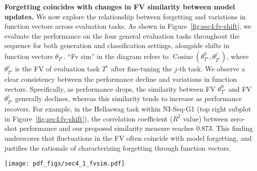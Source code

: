 

\textbf{Forgetting coincides with changes in FV similarity between model updates.} 
We now explore the relationship between forgetting and variations in function vectors across evaluation tasks. As shown in Figure~\ref{fig:sec4:fv-shift}, we evaluate the performance on the four general evaluation tasks throughout the sequence for both generation and classification settings, alongside shifts in function vectors $\theta_{T^e}$. ``Fv sim'' in the diagram refers to $\operatorname{Cosine}(\theta_{T^e}^0, \theta_{T^e}^j)$, where $\theta_{T^e}^j$ is the FV of evaluation task $T^e$ after fine-tuning the $j$-th task.
We observe a clear consistency between the performance decline and variations in function vectors. Specifically, as performance drops, the similarity between FV $\theta_{T^e}^0$ and FV $\theta_{T^e}^j$ generally declines, whereas this similarity tends to increase as performance recovers. For example, in the Hellaswag task within NI-Seq-G1 (top right subplot in Figure~\ref{fig:sec4:fv-shift}),  the correlation coefficient ($R^2$ value) between zero-shot performance and our proposed similarity measure reaches 0.873. This finding underscores that fluctuations in the FV often coincide with model forgetting, and 
justifies the rationale of characterizing forgetting through function vectors.

\begin{figure*}[ht]
  \centering
  \texttt{[image: pdf\_figs/sec4\_1\_fvsim.pdf]}
  \vspace{-2.0em}
  \caption{The shifts in function vector with 0/5-shot performance during tuning. The bar chart corresponding to the left y-axis shows the similarity of function vectors to their initial state. The line graph corresponding to the right y-axis depicts the model's Rouge-L metric on test data. {\textit{\textbf{Main conclusion:} A significant correlation between performance (line data) and FV similarity (bar data).} The correlation plots with more data point are provided in Fig.~\ref{fig:app:corr}.}}
  \label{fig:sec4:fv-shift}
  \vspace{-1.0em}
\end{figure*}


